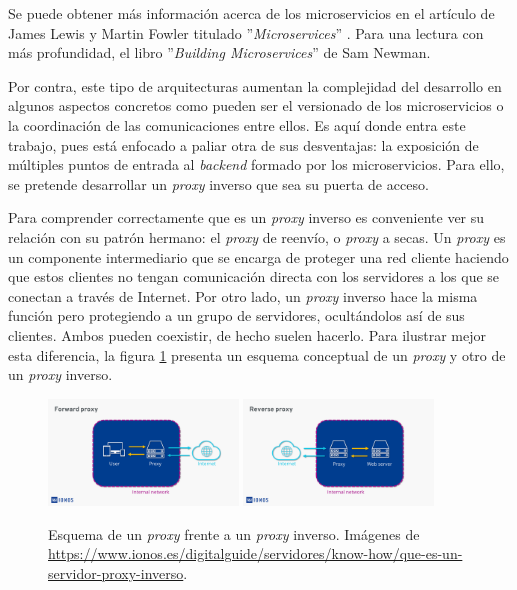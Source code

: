 \documentclass[11pt,spanish,listoffigures]{tfgetsinf}
\begin{document}
Se puede obtener más información acerca de los microservicios en el artículo de James Lewis y Martin Fowler titulado ''\emph{Microservices}'' \cite{LewisAndFowler}. Para una lectura con más profundidad, el libro ''\emph{Building Microservices}'' \cite{Newman} de Sam Newman.

Por contra, este tipo de arquitecturas aumentan la complejidad del desarrollo en algunos aspectos concretos como pueden ser el versionado de los microservicios o la coordinación de las comunicaciones entre ellos. Es aquí donde entra este trabajo, pues está enfocado a paliar otra de sus desventajas: la exposición de múltiples puntos de entrada al \emph{backend} formado por los microservicios. Para ello, se pretende desarrollar un \emph{proxy} inverso que sea su puerta de acceso.

Para comprender correctamente que es un \emph{proxy} inverso es conveniente ver su relación con su patrón hermano: el \emph{proxy} de reenvío, o \emph{proxy} a secas. Un \emph{proxy} es un componente intermediario que se encarga de proteger una red cliente haciendo que estos clientes no tengan comunicación directa con los servidores a los que se conectan a través de Internet. Por otro lado, un \emph{proxy} inverso hace la misma función pero protegiendo a un grupo de servidores, ocultándolos así de sus clientes. Ambos pueden coexistir, de hecho suelen hacerlo. Para ilustrar mejor esta diferencia, la figura \ref{proxyContraProxyInverso} presenta un esquema conceptual de un \emph{proxy} y otro de un \emph{proxy} inverso.

\begin{figure}[ht]
\centering
\includegraphics[width=0.45\textwidth]{imagenes/proxy}
\includegraphics[width=0.45\textwidth]{imagenes/proxyInverso}
\caption[Esquema de un \emph{proxy} frente a un \emph{proxy} inverso.]{Esquema de un \emph{proxy} frente a un \emph{proxy} inverso. Imágenes de \url{https://www.ionos.es/digitalguide/servidores/know-how/que-es-un-servidor-proxy-inverso}.}
	\label{proxyContraProxyInverso}
\end{figure}
\end{document}
